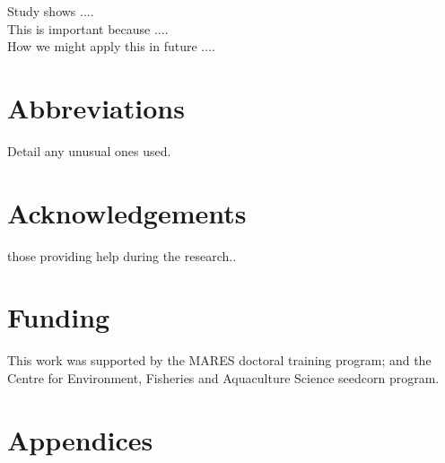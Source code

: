 \documentclass[review]{elsarticle}
\begin{document}
Study shows ....\\

This is important because .... \\

How we might apply this in future .... \\

\section*{Abbreviations} Detail any unusual ones used.

\section*{Acknowledgements} those providing help during the research..

\section*{Funding} This work was supported by the MARES doctoral training
program; and the Centre for Environment, Fisheries and Aquaculture Science
seedcorn program.

\section*{Appendices}



\clearpage
\footnotesize


\clearpage
\footnotesize

\end{document}
